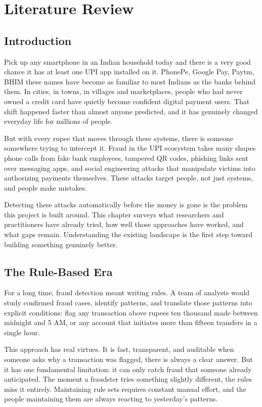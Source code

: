 \chapter{Literature Review}

\section{Introduction}

Pick up any smartphone in an Indian household today and there is a very good chance it has at least one UPI app installed on it. PhonePe, Google Pay, Paytm, BHIM these names have become as familiar to most Indians as the banks behind them. In cities, in towns, in villages and marketplaces, people who had never owned a credit card have quietly become confident digital payment users. That shift happened faster than almost anyone predicted, and it has genuinely changed everyday life for millions of people.

But with every rupee that moves through these systems, there is someone somewhere trying to intercept it. Fraud in the UPI ecosystem takes many shapes phone calls from fake bank employees, tampered QR codes, phishing links sent over messaging apps, and social engineering attacks that manipulate victims into authorizing payments themselves. These attacks target people, not just systems, and people make mistakes.

Detecting these attacks automatically before the money is gone is the problem this project is built around. This chapter surveys what researchers and practitioners have already tried, how well those approaches have worked, and what gaps remain. Understanding the existing landscape is the first step toward building something genuinely better.

\section{The Rule-Based Era}

For a long time, fraud detection meant writing rules. A team of analysts would study confirmed fraud cases, identify patterns, and translate those patterns into explicit conditions: flag any transaction above rupees ten thousand made between midnight and 5 AM, or any account that initiates more than fifteen transfers in a single hour.

This approach has real virtues. It is fast, transparent, and auditable when someone asks why a transaction was flagged, there is always a clear answer. But it has one fundamental limitation: it can only catch fraud that someone already anticipated. The moment a fraudster tries something slightly different, the rules miss it entirely. Maintaining rule sets requires constant manual effort, and the people maintaining them are always reacting to yesterday's patterns.

